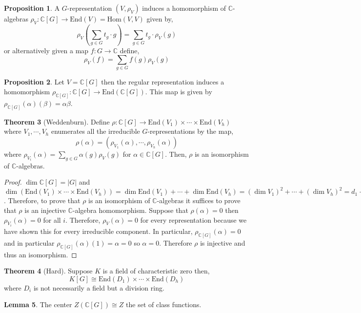\documentclass[12pt]{extarticle}
\newcommand{\C}{\mathbb{C}}
\newcommand{\End}[1]{\text{End}\left( #1 \right)}
\newcommand{\Hom}[2]{\mathrm{Hom}\left( #1, #2 \right)}
\theoremstyle{definition}
\newtheorem{theorem}{Theorem}[section]
\newtheorem{lemma}[theorem]{Lemma}
\newtheorem{proposition}[theorem]{Proposition}
\begin{document}
\begin{proposition}
A $G$-representation $(V, \rho_V)$ induces a homomorphism of $\C$-algebras $\rho_V : \C[G] \to \End{V} = \Hom{V}{V}$ given by,
\[ \rho_V \left( \sum_{g \in G} t_g \cdot g \right) = \sum_{g \in G} t_g \cdot \rho_V(g) \]
or alternatively given a map $f : G \to \C$ define,
\[ \rho_V(f) = \sum_{g \in G} f(g) \rho_V(g)\]
\end{proposition}

\begin{proposition}
Let $V = \C[G]$ then the regular representation induces a homomorphism $\rho_{\C[G]} : \C[G] \to \End{\C[G]}$. This map is given by $\rho_{\C[G]}(\alpha)(\beta) = \alpha \beta$. 
\end{proposition}

\begin{theorem}[Weddenburn]
Define $\rho : \C[G] \to \End{V_1} \times \cdots \times \End{V_h}$ where $V_1, \cdots, V_h$ enumerates all the irreducible $G$-representations by the map,
 \[\rho(\alpha) = (\rho_{V_1}(\alpha), \cdots, \rho_{V_h}(\alpha))\] where $\rho_{V_i}(\alpha) = \sum\limits_{g \in G} \alpha(g) \rho_V(g)$ for $\alpha \in \C[G]$. Then, $\rho$ is an isomorphism of $\C$-algebras. 
\end{theorem}


\begin{proof}
$\dim{\C[G]} = |G|$ and $\dim{(\End{V_1} \times \cdots \times \End{V_h})} = \dim{\End{V_1}} + \cdots + \dim{\End{V_h}} = (\dim{V_1})^2 + \cdots + (\dim{V_h})^2 = d_1 + \cdots + d_h^2 = |G|$. Therefore, to prove that $\rho$ is an isomorphism of $\C$-algebras it suffices to prove that $\rho$ is an injective $\C$-algebra homomorphism. Suppose that $\rho(\alpha) = 0$ then $\rho_{V_i}(\alpha) = 0$ for all $i$. Therefore, $\rho_V(\alpha) = 0$ for every representation because we have shown this for every irreducible component. In particular, $\rho_{\C[G]}(\alpha) = 0$ and in particular $\rho_{\C[G]}(\alpha)(1) = \alpha = 0$ so $\alpha = 0$. Therefore $\rho$ is injective and thus an isomorphism.  
\end{proof}

\begin{theorem}[Hard]
Suppose $K$ is a field of characteristic zero then,
\[K[G] \cong \End{D_1} \times \cdots \times \End{D_h}\]
where $D_i$ is not necessarily a field but a division ring. 
\end{theorem}

\begin{lemma}
The center $Z(\C[G]) \cong Z$ the set of class functions.
\end{lemma}
\end{document}
